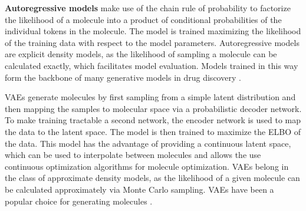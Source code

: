 \textbf{Autoregressive models} make use of the chain rule of probability to factorize the
likelihood of a molecule into a product of conditional probabilities of the individual tokens in the
molecule. The model is trained maximizing the likelihood of the training data with respect to the
model parameters. Autoregressive models are explicit density models, as the likelihood of sampling a
molecule can be calculated exactly, which facilitates model evaluation. Models trained in this way
form the backbone of many generative models in drug discovery
\citep{gomez-bombarelliAutomaticChemicalDesign2018,seglerGeneratingFocusedMolecule2018,olivecronaMolecularDenovoDesign2017,guoAugmentedMemoryCapitalizing2023,thomasAugmentedHillClimbIncreases2022,jaquesSequenceTutorConservative2016,cohen-karlikOvercomingOrderAutoregressive2024}.

\Acp{VAE} \citep{kingmaAutoEncodingVariationalBayes2013} generate molecules by first
sampling from a simple latent distribution and then mapping the samples to molecular space
via a probabilistic decoder network. To make training tractable a second network, the
encoder network is used to map the data to the latent space. The model is then trained to
maximize the \ac{ELBO} of the data.
This model has the advantage of providing a continuous latent space, which can be used to
interpolate between molecules and allows the use continuous optimization algorithms for molecule
optimization. \acp{VAE} belong in the class of approximate density models, as the likelihood of a given
molecule can be calculated approximately via Monte Carlo sampling. \acp{VAE} have been a popular choice
for generating molecules
\citep{gomez-bombarelliAutomaticChemicalDesign2018,kusnerGrammarVariationalAutoencoder2017,simonovskyGraphVAEGenerationSmall2018,samantaNeVAEDeepGenerative2018,jinJunctionTreeVariational2018,daiSyntaxDirectedVariationalAutoencoder2018,liuConstrainedGraphVariational2018}.

